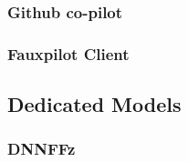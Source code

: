 \subsubsection{Github co-pilot} \cite{imai2022github}
\subsubsection{Fauxpilot Client}
\subsection{Dedicated Models}
\subsubsection{DNNFFz}